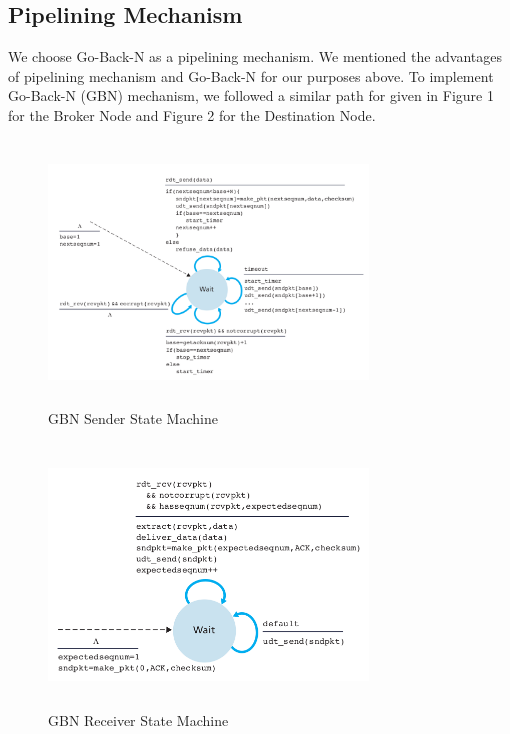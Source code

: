 \documentclass[conference]{IEEEtran}
\begin{document}
\subsection{Pipelining Mechanism}
We choose Go-Back-N as a pipelining mechanism. We mentioned the advantages of pipelining mechanism and Go-Back-N for our purposes above. To implement Go-Back-N (GBN) mechanism, we followed a similar path for given in Figure 1 for the Broker Node and Figure 2 for the Destination Node. 
\begin{figure}[t]
\includegraphics[width=8.5cm, height=7cm]{gbn_sender.png}
 \caption{GBN Sender State Machine}
 \label{fig:1}
\end{figure}
\begin{figure}[t]
\includegraphics[width=8.5cm, height=7cm]{gbn_receiver.png}
 \caption{GBN Receiver State Machine}
 \label{fig:1}
\end{figure}
\end{document}
